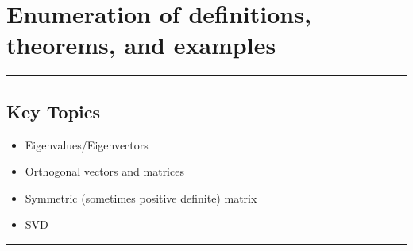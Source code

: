 
 
\section*{Enumeration of definitions, theorems, and examples}

\rule[0.0001in]{\textwidth}{0.000025in}


\subsection*{Key Topics}
\begin{itemize}
	\item Eigenvalues/Eigenvectors
	\item Orthogonal vectors and matrices
	\item Symmetric (sometimes positive definite) matrix
	\item SVD
	
\end{itemize}
\rule[0.0001in]{\textwidth}{0.000025in}



